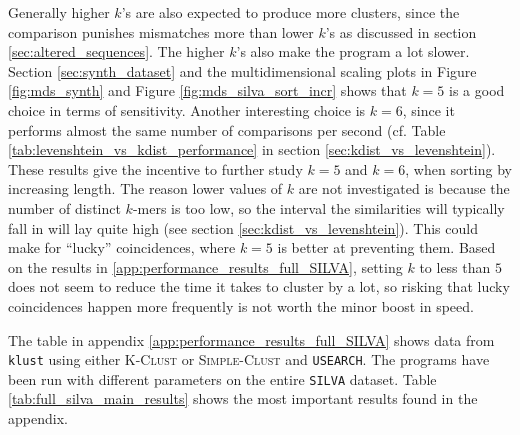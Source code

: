 Generally higher $k$'s are also expected to produce more clusters, since the
comparison punishes mismatches more than lower $k$'s as discussed in section
\ref{sec:altered_sequences}. The higher $k$'s also make the program a lot
slower. Section \ref{sec:synth_dataset} and the multidimensional scaling plots
in Figure \ref{fig:mds_synth} and Figure \ref{fig:mds_silva_sort_incr} shows
that $k=5$ is a good choice in terms of sensitivity. Another interesting choice
is $k=6$, since it performs almost the same number of comparisons per second
(cf.  Table \ref{tab:levenshtein_vs_kdist_performance} in section
\ref{sec:kdist_vs_levenshtein}). These results give the incentive to further
study $k=5$ and $k=6$, when sorting by increasing length. The reason lower
values of $k$ are not investigated is because the number of distinct $k$-mers
is too low, so the interval the similarities will typically fall in will lay
quite high (see section \ref{sec:kdist_vs_levenshtein}). This could make for
``lucky'' coincidences, where $k=5$ is better at preventing them. Based on the
results in \ref{app:performance_results_full_SILVA}, setting $k$ to less than
$5$ does not seem to reduce the time it takes to cluster by a lot, so risking
that lucky coincidences happen more frequently is not worth the minor boost in
speed.

The table in appendix \ref{app:performance_results_full_SILVA} shows data
from \texttt{klust} using either \textsc{K-Clust} or \textsc{Simple-Clust} and
\texttt{USEARCH}. The programs have been run with different parameters on the
entire \texttt{SILVA} dataset. Table \ref{tab:full_silva_main_results} shows
the most important results found in the appendix.

